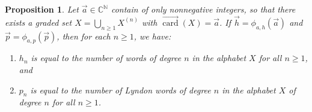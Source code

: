 \documentclass[11pt]{amsart}
\newtheorem{proposition}[theorem]{Proposition}
\theoremstyle{definition}
\numberwithin{equation}{section}
\def\NN{{\mathbb N}}
\def\CC{{\mathbb C}}
\newcommand{\veccard}{\overrightarrow{\operatorname{card}}}
\begin{document}
\begin{proposition}
\label{prop:combinatorialinterpretation}
Let $\vec{a} \in \CC^{\NN}$ contain of only nonnegative integers, so that there exists a graded set $X = \bigcup_{n \geq 1} X^{(n)}$ with $\veccard(X) = \vec{a}$.  
If $\vec{h} = \phi_{a, h}(\vec{a})$ and $\vec{p} = \phi_{a, p}(\vec{p})$, then for each $n \geq 1$, we have:
\begin{enumerate}[itemsep = 0.5em]
\item $h_n$ is equal to the number of words of degree $n$ in the alphabet $X$ for all $n \ge 1$, and 

\item $p_n$ is equal to the number of Lyndon words of degree $n$ in the alphabet $X$ of degree $n$ for all $n \ge 1$.

\end{enumerate}
\end{proposition}
\end{document}
